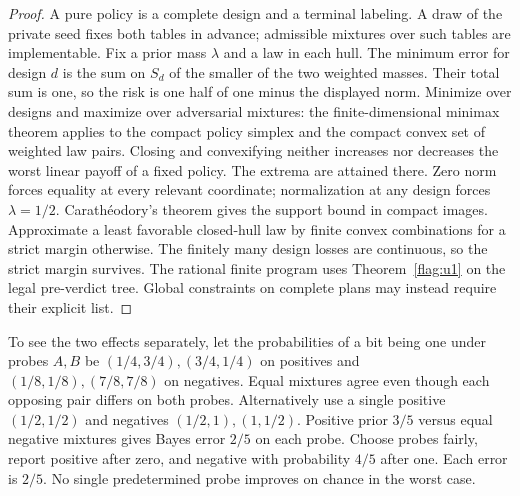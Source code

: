 \begin{proof}
A pure policy is a complete design and a terminal labeling. A draw of the private seed fixes both tables in advance; admissible mixtures over such tables are implementable. Fix a prior mass \(\lambda\) and a law in each hull. The minimum error for design \(d\) is the sum on \(S_d\) of the smaller of the two weighted masses. Their total sum is one, so the risk is one half of one minus the displayed norm. Minimize over designs and maximize over adversarial mixtures: the finite-dimensional minimax theorem applies to the compact policy simplex and the compact convex set of weighted law pairs. Closing and convexifying neither increases nor decreases the worst linear payoff of a fixed policy. The extrema are attained there. Zero norm forces equality at every relevant coordinate; normalization at any design forces \(\lambda=1/2\). Carathéodory's theorem gives the support bound in compact images. Approximate a least favorable closed-hull law by finite convex combinations for a strict margin otherwise. The finitely many design losses are continuous, so the strict margin survives. The rational finite program uses Theorem~\ref{flag:u1} on the legal pre-verdict tree. Global constraints on complete plans may instead require their explicit list.
\end{proof}
To see the two effects separately, let the probabilities of a bit being one under probes \(A,B\) be \((1/4,3/4),(3/4,1/4)\) on positives and \((1/8,1/8),(7/8,7/8)\) on negatives. Equal mixtures agree even though each opposing pair differs on both probes. Alternatively use a single positive \((1/2,1/2)\) and negatives \((1/2,1),(1,1/2)\). Positive prior \(3/5\) versus equal negative mixtures gives Bayes error \(2/5\) on each probe. Choose probes fairly, report positive after zero, and negative with probability \(4/5\) after one. Each error is \(2/5\). No single predetermined probe improves on chance in the worst case.

